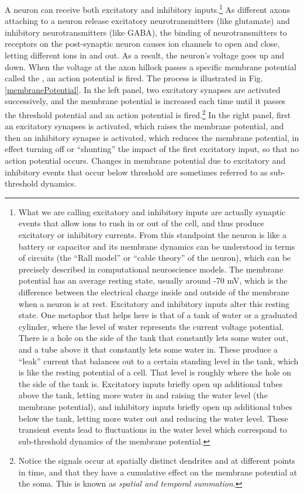 A neuron can receive both excitatory and inhibitory inputs.\footnote{What we are calling excitatory and inhibitory inputs are actually synaptic events that allow ions to rush in or out of the cell, and thus produce excitatory or inhibitory currents. From this standpoint the neuron is like a battery or capacitor and its membrane dynamics can be understood in terms of circuits (the ``Rall model'' or ``cable theory'' of the neuron), which can be precisely described in computational neuroscience models. The membrane potential has an average resting state, usually around -70 mV, which is the difference between the electrical charge inside and outside of the membrane when a neuron is at rest. Excitatory and inhibitory inputs alter this resting state. One metaphor that helps here is that of a tank of water or a graduated cylinder, where the level of water represents the current voltage potential. There is a hole on the side of the tank that constantly lets some water out, and a tube above it that constantly lets some water in. These produce a ``leak'' current that balances out to a certain standing level in the tank, which is like the resting potential of a cell. That level is roughly where the hole on the side of the tank is. Excitatory inputs briefly open up additional tubes above the tank, letting more water in and raising the water level (the membrane potential), and inhibitory inputs briefly open up additional tubes below the tank, letting more water out and reducing the water level. These transient events lead to fluctuations in the water level which correspond to sub-threshold dynamics of the membrane potential.} As different axons attaching to a neuron release excitatory neurotransmitters (like glutamate) and inhibitory neurotransmitters (like GABA), the binding of neurotransmitters to receptors on the post-synaptic neuron causes ion channels to open and close, letting different ions in and out. As a result, the neuron's voltage goes up and down. When the voltage at the axon hillock passes a specific membrane potential called the , an action potential is fired. The process is illustrated in Fig. \ref{membranePotential}. In the left panel, two excitatory synapses are activated successively, and the membrane potential is increased each time until it passes the threshold potential and an action potential is fired.\footnote{Notice the signals occur at spatially distinct dendrites and at different points in time, and that they have a cumulative effect on the membrane potential at the soma. This is known as \emph{spatial and temporal summation}.}  In the right panel, first an excitatory synapses is activated, which raises the membrane potential, and then an inhibitory synapse is activated, which reduces the membrane potential, in effect turning off or ``shunting'' the impact of the first excitatory input, so that no action potential occurs. Changes in membrane potential due to excitatory and inhibitory events that occur below threshold are sometimes referred to as sub-threshold dynamics.

